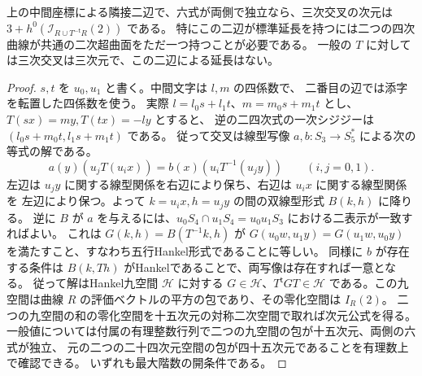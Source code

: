 \begin{proposition}\label{prop:trisecant-common-quadric}
上の中間座標による隣接二辺で、六式が両側で独立なら、三次交叉の次元は
$3+h^0(\mathcal I_{R\cup T^{-\mathsf t}R}(2))$ である。
特にこの二辺が標準延長を持つには二つの四次曲線が共通の二次超曲面をただ一つ持つことが必要である。
一般の $T$ に対しては三次交叉は三次元で、この二辺による延長はない。
\end{proposition}
\begin{proof}
$s,t$ を $u_0,u_1$ と書く。中間文字は $l,m$ の四係数で、
二番目の辺では添字を転置した四係数を使う。
実際 $l=l_0 s+l_1t$、$m=m_0s+m_1t$ とし、$T(sx)=my,T(tx)=-ly$ とすると、
逆の二四次式の一次シジジーは $(l_0s+m_0t,l_1s+m_1t)$ である。
従って交叉は線型写像 $a,b:S_3\to S_5^*$ による次の等式の解である。
\[
     a(y)(u_j T(u_i x))=b(x)(u_i T^{-1}(u_j y))
              \qquad (i,j=0,1).
\]
左辺は $u_j y$ に関する線型関係を右辺により保ち、右辺は $u_i x$ に関する線型関係を
左辺により保つ。よって $k=u_i x,h=u_j y$ の間の双線型形式 $B(k,h)$ に降りる。
逆に $B$ が $a$ を与えるには、$u_0S_4\cap u_1S_4=u_0u_1S_3$ における二表示が一致すればよい。
これは $G(k,h)=B(T^{-1}k,h)$ が
$G(u_0 w,u_1y)=G(u_1w,u_0y)$ を満たすこと、すなわち五行Hankel形式であることに等しい。
同様に $b$ が存在する条件は $B(k,Th)$ がHankelであることで、両写像は存在すれば一意となる。
従って解はHankel九空間 $\mathcal H$ に対する $G\in\mathcal H$、$T^{\mathsf t}GT\in\mathcal H$
である。この九空間は曲線 $R$ の評価ベクトルの平方の包であり、その零化空間は $I_R(2)$。
二つの九空間の和の零化空間を十五次元の対称二次空間で取れば次元公式を得る。
一般値については付属の有理整数行列で二つの九空間の包が十五次元、両側の六式が独立、
元の二つの二十四次元空間の包が四十五次元であることを有理数上で確認できる。
いずれも最大階数の開条件である。
\end{proof}

